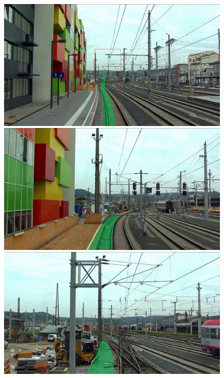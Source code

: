 \begin{figure}[H]
    \centering

    \begin{minipage}{0.195\textwidth}
        \includegraphics[width=\textwidth]{PICs/experiments/autocropExperiments/output_frames/frame_100.png}
    \end{minipage}
    \hfill
    \begin{minipage}{0.195\textwidth}
        \includegraphics[width=\textwidth]{PICs/experiments/autocropExperiments/output_frames/frame_700.png}
    \end{minipage}
    \hfill
    \begin{minipage}{0.195\textwidth}
        \includegraphics[width=\textwidth]{PICs/experiments/autocropExperiments/output_frames/frame_1000.png}

\end{minipage}
\end{figure}
